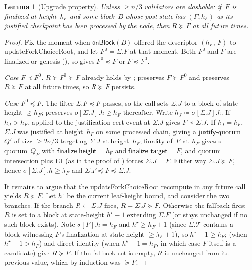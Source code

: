\documentclass{article}
\newcommand{\T}[0]{\ensuremath{\mathcal{T}}}
\newcommand{\just}{\ensuremath{\mathsf{justify}}\xspace}
\newcommand{\finalizeHeight}{\mathsf{finalize\_height}}
\newcommand{\finalizeTarget}{\mathsf{finalize\_target}}
\newcommand{\onBlock}{\textsf{onBlock}\xspace}
\newcommand{\updateForkChoiceRoot}{\textsf{updateForkChoiceRoot}\xspace}
\theoremstyle{plain}
\newtheorem{lemma}{Lemma}
\theoremstyle{definition}
\theoremstyle{remark}
\begin{document}
\begin{lemma}[Upgrade property]\label{lem:upgrade}
Unless $\geq n/3$ validators are slashable: if~$F$ is finalized at height~$h_F$ and some block~$B$ whose post-state has $(F, h_F)$ as its justified checkpoint has been processed by the node, then $R \succeq F$ at all future times.
\end{lemma}

\begin{proof}
Fix the moment when $\onBlock(B)$ offered the descriptor $(h_F,\, F)$ to \updateForkChoiceRoot, and let $F^0 = \Sigma.F$ at that moment.
Both $F^0$ and $F$ are finalized or genesis (), so  gives $F^0 \preceq F$ or $F \preceq F^0$.

\emph{Case $F \preceq F^0$.}
$R \succeq F^0 \succeq F$ already holds by ;  preserves $F \succeq F^0$ and  preserves $R \succeq F$ at all future times, so $R \succeq F$ persists.

\emph{Case $F^0 \preceq F$.}
The filter $\Sigma.F \preceq F$ passes, so the call sets $\Sigma.J$ to a block of state-height $\geq h_F$;  preserves $\sigma[\Sigma.J].h \geq h_F$ thereafter.
Write $h_J \coloneqq \sigma[\Sigma.J].h$.
If $h_J > h_F$,  applied to the justification cert event at $\Sigma.J$ gives $F \prec \Sigma.J$.
If $h_J = h_F$, $\Sigma.J$ was justified at height~$h_F$ on some processed chain, giving a \just-quorum~$Q'$ of size $\geq 2n/3$ targeting $\Sigma.J$ at height~$h_F$; finality of~$F$ at~$h_F$ gives a quorum~$Q_F$ with $\finalizeHeight = h_F$ and $\finalizeTarget = F$, and quorum intersection plus E1 (as in the proof of ) forces $\Sigma.J = F$.
Either way $\Sigma.J \succeq F$, hence $\sigma[\Sigma.J].h \geq h_F$ and $\Sigma.F \preceq F \preceq \Sigma.J$.

It remains to argue that the \updateForkChoiceRoot recompute in any future call yields $R \succeq F$.
Let $h^\star$ be the current leaf-height bound, and consider the two branches.
If the branch $R \gets \Sigma.J$ fires, $R = \Sigma.J \succeq F$.
Otherwise the fallback fires: $R$ is set to a block at state-height $h^\star - 1$ extending $\Sigma.F$ (or stays unchanged if no such block exists).
Note $\sigma[F].h = h_F$ and $h^\star \geq h_F + 1$ (since $\Sigma.\T$ contains a block witnessing $F$'s finalization at state-height $\geq h_F + 1$), so $h^\star - 1 \geq h_F$;  (when $h^\star - 1 > h_F$) and direct identity (when $h^\star - 1 = h_F$, in which case $F$ itself is a candidate) give $R \succeq F$.
If the fallback set is empty, $R$ is unchanged from its previous value, which by induction was $\succeq F$.
\end{proof}
\end{document}
